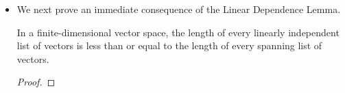 \documentclass[../main.tex]{subfiles}
\begin{document}
\begin{itemize}
\begin{lemma}
    \end{lemma}
    \item We next prove an immediate consequence of the Linear Dependence Lemma.
    \begin{theorem}\label{trm:linearIndependent-Spanning}
        In a finite-dimensional vector space, the length of every linearly independent list of vectors is less than or equal to the length of every spanning list of vectors.
        \begin{proof}


\end{proof}
\end{theorem}
\end{itemize}
\end{document}
